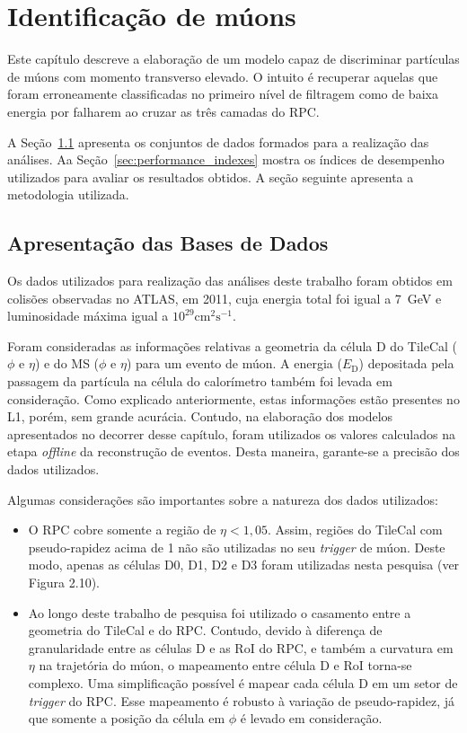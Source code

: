 \chapter{Identificação de múons}

Este capítulo descreve a elaboração de um modelo capaz de discriminar partículas
de múons com momento transverso elevado. O intuito é recuperar aquelas que
foram erroneamente classificadas no primeiro nível de filtragem como de baixa
energia por falharem ao cruzar as três camadas do RPC. 

A Seção~\ref{sec:data-section} apresenta os conjuntos de dados formados para a
realização das análises. Aa Seção~\ref{sec:performance_indexes} mostra os
índices de desempenho utilizados para avaliar os resultados obtidos. A seção
seguinte apresenta a metodologia utilizada.

\section{Apresentação das Bases de Dados}
\label{sec:data-section}

Os dados utilizados para realização das análises deste trabalho foram obtidos em
colisões observadas no ATLAS, em 2011, cuja energia total foi igual a 7~GeV e
luminosidade máxima igual a $10^{29}\text{cm}^2\text{s}^{-1}$.

Foram consideradas as informações relativas a geometria da célula D do TileCal
($\phi$ e $\eta$) e do MS ($\phi$ e $\eta$) para um evento de múon.  A energia
($E_\text{D}$) depositada pela passagem da partícula na célula do calorímetro também
foi levada em consideração. Como explicado anteriormente, estas informações
estão presentes no L1, porém, sem grande acurácia.  Contudo, na elaboração dos
modelos apresentados no decorrer desse capítulo, foram utilizados os valores
calculados na etapa \emph{offline} da reconstrução de eventos. Desta maneira,
garante-se a precisão dos dados utilizados.

Algumas considerações são importantes sobre a natureza dos dados utilizados:

\begin{itemize}

    \item O RPC cobre somente a região de $\eta < 1,05$. Assim, regiões do
    TileCal com pseudo-rapidez acima de 1 não são utilizadas no seu
    \emph{trigger} de múon.  Deste modo, apenas as células D0, D1, D2 e D3 foram
    utilizadas nesta pesquisa (ver Figura 2.10).

    \item Ao longo deste trabalho de pesquisa foi utilizado o casamento entre a
    geometria do TileCal e do RPC. Contudo, devido à diferença de granularidade
    entre as células D e as RoI do RPC, e também a curvatura em $\eta$ na
    trajetória do múon, o mapeamento entre célula D e RoI torna-se complexo. Uma
    simplificação possível é mapear cada célula D em um setor de \emph{trigger}
    do RPC. Esse mapeamento é robusto à variação de pseudo-rapidez, já que
    somente a posição da célula em $\phi$ é levado em consideração.

\end{itemize}

